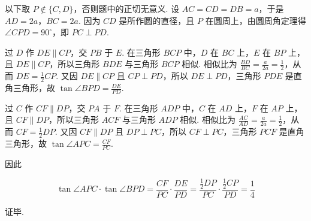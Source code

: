 \begin{solution}
以下取 \(P\notin\{C,D\}\)，否则题中的正切无意义. 设 \(AC=CD=DB=a\)，于是 \(AD=2a\)，\(BC=2a\). 因为 \(CD\) 是所作圆的直径，且 \(P\) 在圆周上，由圆周角定理得 \(\angle CPD=90^\circ\)，即 \(PC\perp PD\).

过 \(D\) 作 \(DE\parallel CP\)，交 \(PB\) 于 \(E\). 在三角形 \(BCP\) 中，\(D\) 在 \(BC\) 上，\(E\) 在 \(BP\) 上，且 \(DE\parallel CP\)，所以三角形 \(BDE\) 与三角形 \(BCP\) 相似. 相似比为
\(\frac{BD}{BC}=\frac{a}{2a}=\frac{1}{2}\)，从而 \(DE=\frac{1}{2}CP\). 又因 \(DE\parallel CP\) 且 \(CP\perp PD\)，所以 \(DE\perp PD\)，三角形 \(PDE\) 是直角三角形，故
\(\tan\angle BPD=\frac{DE}{PD}\).

过 \(C\) 作 \(CF\parallel DP\)，交 \(PA\) 于 \(F\). 在三角形 \(ADP\) 中，\(C\) 在 \(AD\) 上，\(F\) 在 \(AP\) 上，且 \(CF\parallel DP\)，所以三角形 \(ACF\) 与三角形 \(ADP\) 相似. 相似比为
\(\frac{AC}{AD}=\frac{a}{2a}=\frac{1}{2}\)，从而 \(CF=\frac{1}{2}DP\). 又因 \(CF\parallel DP\) 且 \(DP\perp PC\)，所以 \(CF\perp PC\)，三角形 \(PCF\) 是直角三角形，故 \(\tan\angle APC=\frac{CF}{PC}\).

因此

\[
\tan\angle APC\cdot\tan\angle BPD=\frac{CF}{PC}\cdot\frac{DE}{PD}=\frac{\frac{1}{2}DP}{PC}\cdot\frac{\frac{1}{2}CP}{PD}=\frac{1}{4}
\]

证毕.
\end{solution}
